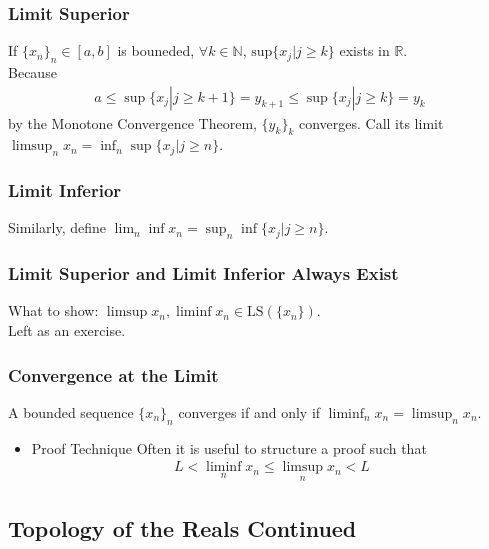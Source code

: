 \documentclass[11pt]{article}
\newcommand{\0}{\emptyset}
\newcommand{\N}{\mathbb{N}}
\newcommand{\R}{\mathbb{R}}
\begin{document}
\subsubsection*{Limit Superior}
\label{sec:orga60e99e}
If \(\{x_{n}\}_{n}\in[a,b]\) is bouneded, \(\forall k\in\N\), \(\text{sup}\{x_{j}|j\geq k\}\) exists in \(\R\).\\[0pt]
Because\\[0pt]
\begin{align*}
  a\leq\sup\{x_{j}|j\geq k+1\}=y_{k+1}\leq\sup\{x_{j}|j\geq k\}=y_{k}
\end{align*}
by the Monotone Convergence Theorem, \(\{y_{k}\}_{k}\) converges. Call its limit \(\limsup_{n}x_{n}=\inf_{n}\sup\{x_{j}|j\geq n\}\).\\[0pt]
\subsubsection*{Limit Inferior}
\label{sec:org6a8e6d3}
Similarly, define \(\lim_{n}\inf x_{n}=\sup_{n}\inf\{x_{j}|j\geq n\}\).\\[0pt]
\subsubsection*{Limit Superior and Limit Inferior Always Exist}
\label{sec:orgcc25688}
What to show: \(\limsup x_{n},\liminf x_{n}\in\text{LS}(\{x_{n}\})\).\\[0pt]
Left as an exercise.\\[0pt]
\subsubsection*{Convergence at the Limit}
\label{sec:orgab7d850}
A bounded sequence \(\{x_{n}\}_{n}\) converges if and only if \(\liminf_{n}x_{n}=\limsup_{n}x_{n}\).\\[0pt]
\begin{itemize}
\item Proof Technique
\label{sec:org63c1cb6}
Often it is useful to structure a proof such that\\[0pt]
\begin{align*}
  L<\liminf_{n}x_{n}\leq\limsup_{n}x_{n}<L
\end{align*}
\end{itemize}
\subsection*{Topology of the Reals Continued}
\label{sec:org875f0ba}
\end{document}
